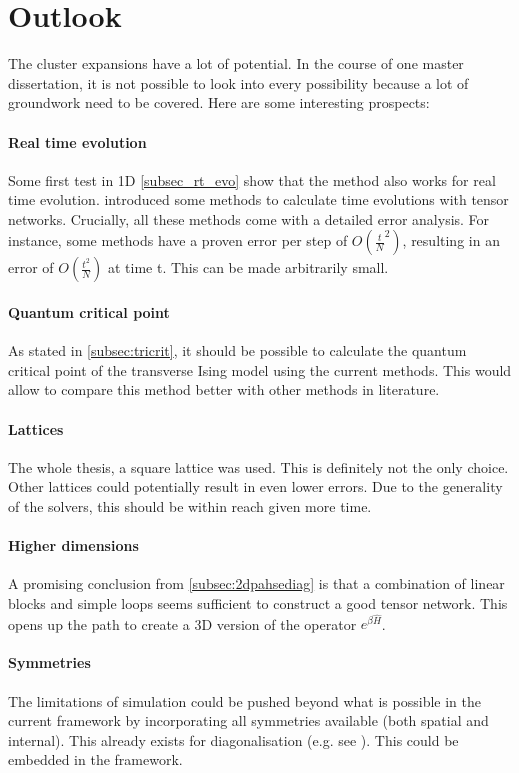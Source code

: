 \section{Outlook}

The cluster expansions have a lot of potential. In the course of one master dissertation, it is not possible to look into every possibility because a lot of groundwork need to be covered. Here are some interesting prospects:

\paragraph{Real time evolution}

Some first test in 1D \cref{subsec_rt_evo} show that the method also works for real time evolution.  introduced some methods to calculate time evolutions with tensor networks. Crucially, all these methods come with a detailed error analysis. For instance, some methods have a proven error per step of $O \left( \frac{t}{N}^2  \right)$, resulting in an error of $O \left( \frac{t^2}{N}  \right)$ at time t. This can be made arbitrarily small.

\paragraph{Quantum critical point}

As stated in \cref{subsec:tricrit}, it should be possible to calculate the quantum critical point of the transverse Ising model using the current methods. This would allow to compare this method better with other methods in literature.

\paragraph{Lattices}

The whole thesis, a square lattice was used. This is definitely not the only choice. Other lattices could potentially result in even lower errors. Due to the generality of the solvers, this should be within reach given more time.

\paragraph{Higher dimensions}

A promising conclusion from \cref{subsec:2dpahsediag} is that a combination of linear blocks and simple loops seems sufficient to construct a good tensor network. This opens up the path to create a 3D version of the operator $e^{\beta \hat{H}}$.

\paragraph{Symmetries}

The limitations of simulation could be pushed beyond what is possible in the current framework by incorporating all symmetries available (both spatial and internal). This already exists for diagonalisation (e.g. see \cite{Wietek2018}). This could be embedded in the framework.
